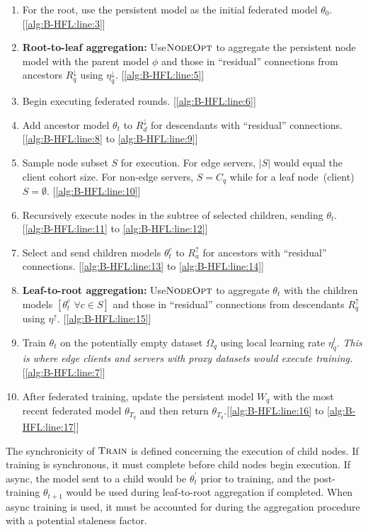 \begin{singlespace*}
    \begin{enumerate}
        \item For the root, use the persistent model as the initial federated model $\theta_0$.  [\cref{alg:B-HFL:line:3}]

        \item \textbf{Root-to-leaf aggregation:} Use$\textsc{NodeOpt}$ to aggregate the persistent node model with the parent model $\phi$ and those in ``residual'' connections from ancestors $R^\downarrow_q$ using $\eta^\downarrow_q$. [\cref{alg:B-HFL:line:5}]
        \item Begin executing federated rounds. [\cref{alg:B-HFL:line:6}]

        \item Add ancestor model $\theta_t$ to $R^\downarrow_d$ for descendants with ``residual'' connections. [\cref{alg:B-HFL:line:8} to \ref{alg:B-HFL:line:9}]
        \item Sample node subset $S$ for execution. For edge servers, $\lvert S \rvert$ would equal the client cohort size. For non-edge servers, $S = C_q$ while for a leaf node~(client) $S = \emptyset$. [\cref{alg:B-HFL:line:10}]
        \item Recursively execute nodes in the subtree of selected children, sending $\theta_t$.  [\cref{alg:B-HFL:line:11} to \ref{alg:B-HFL:line:12}]
        \item Select and send children models $\theta_t^c$ to $R^\uparrow_a$ for ancestors with ``residual'' connections. [\cref{alg:B-HFL:line:13} to \ref{alg:B-HFL:line:14}]
        \item \textbf{Leaf-to-root aggregation:} Use$\textsc{NodeOpt}$ to aggregate $\theta_t$ with the children models $[\theta^c_t \,\, \forall c \in S]$ and those in ``residual'' connections from descendants $R^\uparrow_q$ using $\eta^\uparrow$.  [\cref{alg:B-HFL:line:15}]
        \item Train $\theta_t$ on the potentially empty dataset $\Omega_q$ using local learning rate $\eta^l_q$. \textit{This is where edge clients and servers with proxy datasets would execute training.} [\cref{alg:B-HFL:line:7}]
        \item After federated training, update the persistent model $W_q$ with the most recent federated model $\theta_{T_q}$ and then return $\theta_{T_q}$.[\cref{alg:B-HFL:line:16} to \ref{alg:B-HFL:line:17}]
    \end{enumerate}
\end{singlespace*}
The synchronicity of $\textsc{Train}$ is defined concerning the execution of child nodes. If training is synchronous, it must complete before child nodes begin execution. If async, the model sent to a child would be $\theta_{t}^\prime$ prior to training, and the post-training $\theta_{t+1}$ would be used during leaf-to-root aggregation if completed. When async training is used, it must be accounted for during the aggregation procedure with a potential staleness factor.


